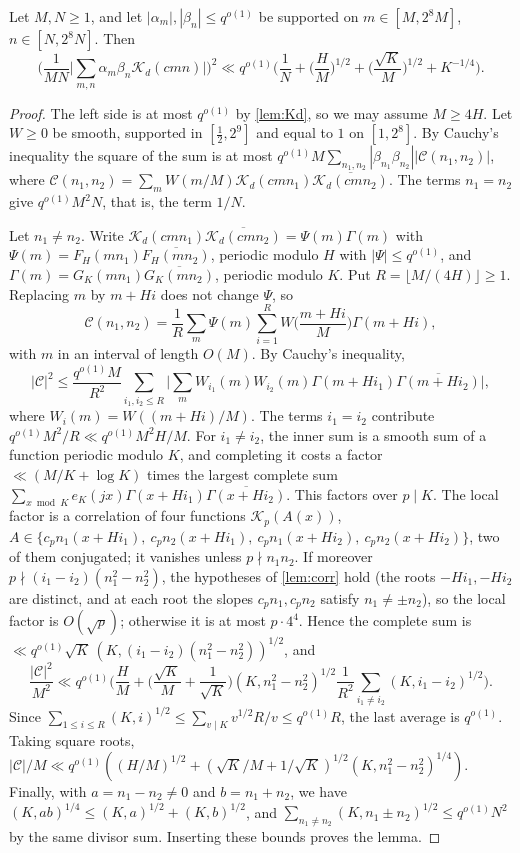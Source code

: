 \documentclass[11pt,colorlinks]{charlie}
\begin{document}
\begin{lemma}\label{lem:bilinear}
Let $M,N\ge1$, and let $|\alpha_m|,|\beta_n|\le q^{o(1)}$ be supported on $m\in[M,2^8M]$, $n\in[N,2^8N]$. Then
\[
 \Big(\frac1{MN}\Big|\sum_{m,n}\alpha_m\beta_n\mathscr K_d(cmn)\Big|\Big)^2\ll q^{o(1)}\Big(\frac1N+\Big(\frac HM\Big)^{1/2}+\Big(\frac{\sqrt K}M\Big)^{1/2}+K^{-1/4}\Big).
\]
\end{lemma}
\begin{proof}
The left side is at most $q^{o(1)}$ by \cref{lem:Kd}, so we may assume $M\ge4H$. Let $W\ge0$ be smooth, supported in $[\frac12,2^9]$ and equal to $1$ on $[1,2^8]$. By Cauchy's inequality the square of the sum is at most $q^{o(1)}M\sum_{n_1,n_2}|\beta_{n_1}\beta_{n_2}||\mathcal C(n_1,n_2)|$, where $\mathcal C(n_1,n_2)=\sum_mW(m/M)\mathscr K_d(cmn_1)\overline{\mathscr K_d(cmn_2)}$. The terms $n_1=n_2$ give $q^{o(1)}M^2N$, that is, the term $1/N$.

Let $n_1\ne n_2$. Write $\mathscr K_d(cmn_1)\overline{\mathscr K_d(cmn_2)}=\Psi(m)\Gamma(m)$ with $\Psi(m)=F_H(mn_1)\overline{F_H(mn_2)}$, periodic modulo $H$ with $|\Psi|\le q^{o(1)}$, and $\Gamma(m)=G_K(mn_1)\overline{G_K(mn_2)}$, periodic modulo $K$. Put $R=\lfloor M/(4H)\rfloor\ge1$. Replacing $m$ by $m+Hi$ does not change $\Psi$, so
\[
 \mathcal C(n_1,n_2)=\frac1R\sum_m\Psi(m)\sum_{i=1}^RW\Big(\frac{m+Hi}M\Big)\Gamma(m+Hi),
\]
with $m$ in an interval of length $O(M)$. By Cauchy's inequality,
\[
 |\mathcal C|^2\le\frac{q^{o(1)}M}{R^2}\sum_{i_1,i_2\le R}\Big|\sum_mW_{i_1}(m)W_{i_2}(m)\Gamma(m+Hi_1)\overline{\Gamma(m+Hi_2)}\Big|,
\]
where $W_i(m)=W((m+Hi)/M)$.
The terms $i_1=i_2$ contribute $q^{o(1)}M^2/R\ll q^{o(1)}M^2H/M$. For $i_1\ne i_2$, the inner sum is a smooth sum of a function periodic modulo $K$, and completing it costs a factor $\ll(M/K+\log K)$ times the largest complete sum $\sum_{x\bmod K}e_K(jx)\Gamma(x+Hi_1)\overline{\Gamma(x+Hi_2)}$. This factors over $p\mid K$. The local factor is a correlation of four functions $\mathscr K_p(A(x))$, $A\in\{c_pn_1(x+Hi_1),\ c_pn_2(x+Hi_1),\ c_pn_1(x+Hi_2),\ c_pn_2(x+Hi_2)\}$, two of them conjugated; it vanishes unless $p\nmid n_1n_2$. If moreover $p\nmid(i_1-i_2)(n_1^2-n_2^2)$, the hypotheses of \cref{lem:corr} hold (the roots $-Hi_1,-Hi_2$ are distinct, and at each root the slopes $c_pn_1,c_pn_2$ satisfy $n_1\ne\pm n_2$), so the local factor is $O(\sqrt p)$; otherwise it is at most $p\cdot4^4$. Hence the complete sum is $\ll q^{o(1)}\sqrt K\,(K,(i_1-i_2)(n_1^2-n_2^2))^{1/2}$, and
\[
 \frac{|\mathcal C|^2}{M^2}\ll q^{o(1)}\Big(\frac HM+\Big(\frac{\sqrt K}M+\frac1{\sqrt K}\Big)(K,n_1^2-n_2^2)^{1/2}\frac1{R^2}\sum_{i_1\ne i_2}(K,i_1-i_2)^{1/2}\Big).
\]
Since $\sum_{1\le i\le R}(K,i)^{1/2}\le\sum_{v\mid K}v^{1/2}R/v\le q^{o(1)}R$, the last average is $q^{o(1)}$. Taking square roots, $|\mathcal C|/M\ll q^{o(1)}((H/M)^{1/2}+(\sqrt K/M+1/\sqrt K)^{1/2}(K,n_1^2-n_2^2)^{1/4})$. Finally, with $a=n_1-n_2\ne0$ and $b=n_1+n_2$, we have $(K,ab)^{1/4}\le(K,a)^{1/2}+(K,b)^{1/2}$, and $\sum_{n_1\ne n_2}(K,n_1\pm n_2)^{1/2}\le q^{o(1)}N^2$ by the same divisor sum. Inserting these bounds proves the lemma.
\end{proof}
\end{document}
